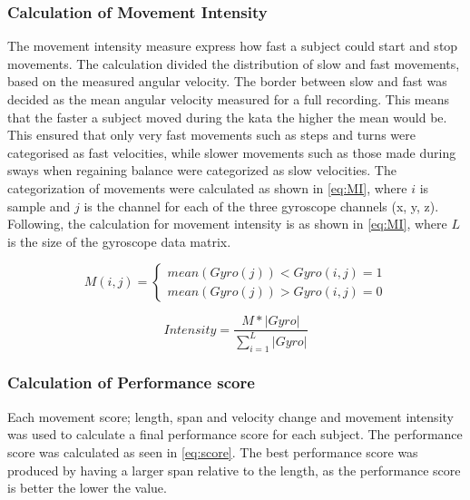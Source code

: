 \subsubsection{Calculation of Movement Intensity}
The movement intensity measure express how fast a subject could start and stop movements. The calculation divided the distribution of slow and fast movements, based on the measured angular velocity. The border between slow and fast was decided as the mean angular velocity measured for a full recording. This means that the faster a subject moved during the kata the higher the mean would be. This ensured that only very fast movements such as steps and turns were categorised as fast velocities, while slower movements such as those made during sways when regaining balance were categorized as slow velocities. The categorization of movements were calculated as shown in \eqref{eq:MI}, where $i$ is sample and $j$ is the channel for each of the three gyroscope channels (x, y, z). Following, the calculation for movement intensity is as shown in \eqref{eq:MI}, where $L$ is the size of the gyroscope data matrix.

\begin{equation} \label{eq:category}
M(i,j) = \left \{
\begin{matrix}
{mean(Gyro(j)) < Gyro(i,j) = 1}\\{mean(Gyro(j)) > Gyro(i,j) = 0}
\end{matrix} \right.
\end{equation}



%


\begin{equation} \label{eq:MI}
Intensity = \frac{M*\left| Gyro\right| }{\sum_{i=1}^{L}\left| Gyro\right| }
\end{equation}


\subsubsection{Calculation of Performance score}
Each movement score; length, span and velocity change and movement intensity was used to calculate a final performance score for each subject. 
The performance score was calculated as seen in \eqref{eq:score}. The best performance score was produced by having a larger span relative to the length, as the performance score is better the lower the value. %


